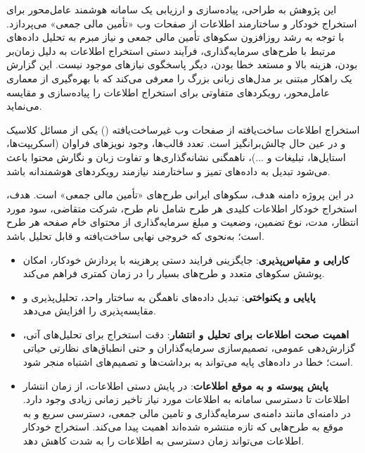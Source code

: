 

این پژوهش به طراحی، پیاده‌سازی و ارزیابی یک سامانه هوشمند عامل‌محور برای استخراج خودکار و ساختارمند اطلاعات از صفحات وب «تأمین مالی جمعی» می‌پردازد. با توجه به رشد روزافزون سکوهای تأمین مالی جمعی و نیاز مبرم به تحلیل داده‌های مرتبط با طرح‌های سرمایه‌گذاری، فرآیند دستی استخراج اطلاعات به دلیل زمان‌بر بودن، هزینه بالا و مستعد خطا بودن، دیگر پاسخگوی نیازهای موجود نیست. این گزارش یک راهکار مبتنی بر مدل‌های زبانی بزرگ را معرفی می‌کند که با بهره‌گیری از معماری عامل‌محور، رویکردهای متفاوتی برای استخراج اطلاعات را پیاده‌سازی و مقایسه می‌نماید.




استخراج اطلاعات ساخت‌یافته از صفحات وب غیرساخت‌یافته () یکی از مسائل کلاسیک و در عین حال چالش‌برانگیز است. تعدد قالب‌ها، وجود نویزهای فراوان (اسکریپت‌ها، استایل‌ها، تبلیغات و ...)، ناهمگنی نشانه‌گذاری‌ها و تفاوت زبان و نگارش محتوا باعث می‌شود تبدیل  به داده‌های تمیز و ساختارمند نیازمند رویکردهای هوشمندانه باشد.


در این پروژه دامنه هدف، سکو‌های ایرانی طرح‌های «تأمین مالی جمعی» است. هدف، استخراج خودکار اطلاعات کلیدی هر طرح شامل نام طرح، شرکت متقاضی، سود مورد انتظار، مدت، نوع تضمین، وضعیت و مبلغ سرمایه‌گذاری از محتوای  خام صفحه هر طرح است؛ به‌نحوی که خروجی نهایی ساخت‌یافته و قابل تحلیل باشد.


\begin{itemize}
\item  \textbf{کارایی و مقیاس‌پذیری}: جایگزینی فرایند دستی پرهزینه با پردازش خودکار، امکان پوشش سکو‌های متعدد و طرح‌های بسیار را در زمان کمتری فراهم می‌کند.

\item  \textbf{پایایی و یکنواختی}: تبدیل داده‌های ناهمگن به ساختار واحد، تحلیل‌پذیری و مقایسه‌پذیری را افزایش می‌دهد.

\item  \textbf{اهمیت صحت اطلاعات برای تحلیل و انتشار}: دقت استخراج برای تحلیل‌های آتی، گزارش‌دهی عمومی، تصمیم‌سازی سرمایه‌گذاران و حتی انطباق‌های نظارتی حیاتی است؛ خطا در داده‌های پایه می‌تواند به برداشت‌ها و تصمیم‌های اشتباه منجر شود.

\item \textbf{پایش پیوسته و به موقع اطلاعات}: در پایش دستی اطلاعات، از زمان انتشار اطلاعات تا دسترسی سامانه به اطلاعات مورد نیاز تاخیر زمانی زیادی وجود دارد. در دامنه‌ای مانند دامنه‌ی سرمایه‌گذاری و تامین مالی جمعی، دسترسی سریع و به موقع به طرح‌هایی که تازه منتشره شده‌اند اهمیت پیدا می‌کند. استخراج خودکار اطلاعات می‌تواند زمان دسترسی به اطلاعات را به شدت کاهش دهد.
\end{itemize}

